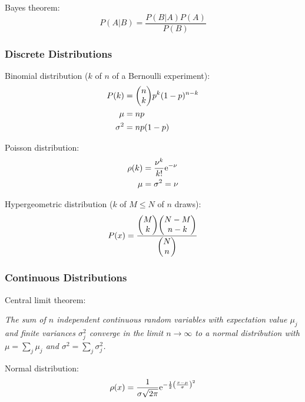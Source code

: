 			\noindent
			Bayes theorem:
			\begin{equation}
				P(A|B) = \frac{P(B|A)P(A)}{P(B)}
			\end{equation}

		\subsubsection{Discrete Distributions}
			\noindent
			Binomial distribution ($k$ of $n$ of a Bernoulli experiment):
			\begin{equation}
				\begin{aligned}
					P(k)&=\binomkoeff{n}{k}p^k(1-p)^{n-k} \\
					\mu &= np \\
					\sigma^2 &= np(1-p)
				\end{aligned}
			\end{equation}

			\noindent
			Poisson distribution:
			\begin{equation}
				\begin{aligned}
					\rho(k) &= \frac{\nu^k}{k!} \mathrm{e}^{-\nu} \\
					\mu &= \sigma^2 = \nu
				\end{aligned}
			\end{equation}

			\noindent
			Hypergeometric distribution ($k$ of $M\le N$ of $n$ draws):
			\begin{equation}
				P(x)=\frac{\binomkoeff{M}{k}\binomkoeff{N-M}{n-k}}{\binomkoeff{N}{n}}
			\end{equation}

		\subsubsection{Continuous Distributions}
			\noindent
			Central limit theorem: \par
			\emph{The sum of $n$ independent continuous random variables with expectation value $\mu_j$ and finite variances $\sigma_j^2$ converge in the limit $n \to \infty$ to a normal distribution with $\mu = \sum_j \mu_j$ and $\sigma^2 = \sum_j \sigma_j^2$.} \vsp

			\noindent
			Normal distribution:
			\begin{equation}
				\rho(x)=\frac{1}{\sigma\sqrt{2\pi}}\mathrm{e}^{-\frac{1}{2}\left(\frac{x-\mu}{\sigma}\right)^2}
			\end{equation}

